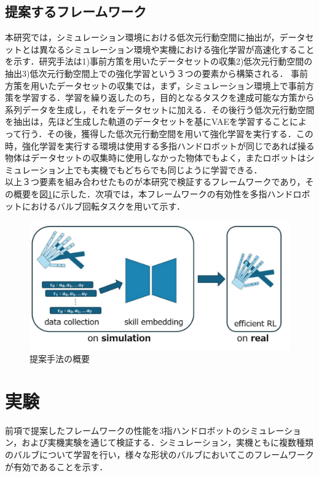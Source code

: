 \documentclass[dvipdfmx]{ampbt_nomag}
\begin{document}
\subsection{提案するフレームワーク}
本研究では，シミュレーション環境における低次元行動空間に抽出が，データセットとは異なるシミュレーション環境や実機における強化学習が高速化することを示す．研究手法は1)事前方策を用いたデータセットの収集2)低次元行動空間の抽出3)低次元行動空間上での強化学習という３つの要素から構築される．
事前方策を用いたデータセットの収集では，まず，シミュレーション環境上で事前方策を学習する．学習を繰り返したのち，目的となるタスクを達成可能な方策から系列データを生成し，それをデータセットに加える．その後行う低次元行動空間を抽出は，先ほど生成した軌道のデータセットを基にVAEを学習することによって行う．その後，獲得した低次元行動空間を用いて強化学習を実行する．この時，強化学習を実行する環境は使用する多指ハンドロボットが同じであれば操る物体はデータセットの収集時に使用しなかった物体でもよく，またロボットはシミュレーション上でも実機でもどちらでも同じように学習できる．\\
以上３つ要素を組み合わせたものが本研究で検証するフレームワークであり，その概要を図\ref{schematic_figure}に示した．次項では，本フレームワークの有効性を多指ハンドロボットにおけるバルブ回転タスクを用いて示す．

\begin{figure}[hbtp]
  \centering
  \includegraphics[width=17cm]
       {asset/img/schematic_figure.pdf}
  \caption{提案手法の概要}
  \label{schematic_figure}
\end{figure}

\clearpage
\section{実験}\label{sec-experiment}
前項で提案したフレームワークの性能を3指ハンドロボットのシミュレーション，および実機実験を通じて検証する．シミュレーション，実機ともに複数種類のバルブについて学習を行い，様々な形状のバルブにおいてこのフレームワークが有効であることを示す．
\end{document}
